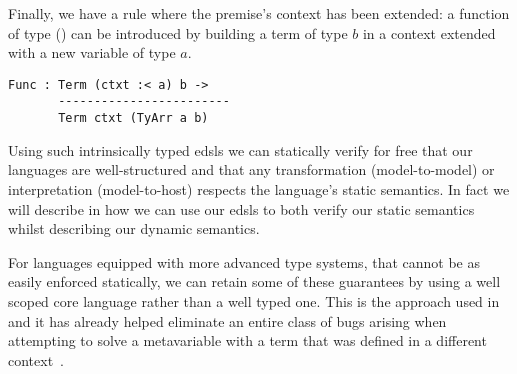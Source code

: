 Finally, we have a rule where the premise's context has been extended:
a function of type () can be introduced by building a term
of type $b$ in a context extended with a new variable of type $a$.

\begin{center}
  \begin{minipage}{0.35\textwidth}
    \inferenceFunc
  \end{minipage}\hfill
  \begin{minipage}{0.55\textwidth}
    \begin{Verbatim}
Func : Term (ctxt :< a) b ->
       ------------------------
       Term ctxt (TyArr a b)
    \end{Verbatim}
  \end{minipage}
\end{center}






\noindent
Using such intrinsically typed \acp{edsl} we can statically verify for free
that our languages are well-structured and that any transformation (model-to-model)
or interpretation (model-to-host) respects the language's static semantics.
%
In fact we will describe in  how we can use our \acp{edsl}
to both verify our static semantics whilst describing our dynamic semantics.

For languages equipped with more advanced type systems, that cannot be as easily
enforced statically, we can retain some of these guarantees by using a well
scoped core language rather than a well typed one.
%
This is the approach used in \Idris{} and it has already helped eliminate an
entire class of bugs arising when attempting to solve a metavariable with a
term that was defined in a different context~\cite{DBLP:conf/ecoop/Brady21}.
